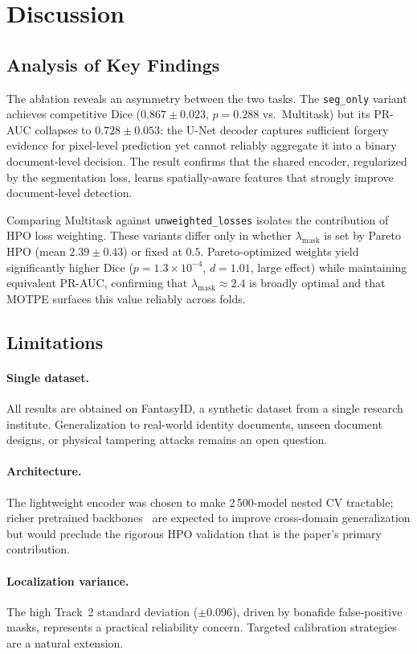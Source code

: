 
\section{Discussion}
\label{sec:discussion}

\subsection{Analysis of Key Findings}

The ablation reveals an asymmetry between the two tasks. The
\texttt{seg\_only} variant achieves competitive Dice ($0.867 \pm 0.023$, $p =
0.288$ vs.\ Multitask) but its PR-AUC collapses to $0.728 \pm 0.053$:
the U-Net decoder captures sufficient forgery evidence for pixel-level
prediction yet cannot reliably aggregate it into a binary document-level
decision. The result confirms that the shared encoder, regularized by the
segmentation loss, learns spatially-aware features that strongly improve
document-level detection.

Comparing Multitask against \texttt{unweighted\_losses} isolates the
contribution of HPO loss weighting. These variants differ only in whether
$\lambda_{\text{mask}}$ is set by Pareto HPO (mean $2.39 \pm 0.43$) or fixed
at $0.5$. Pareto-optimized weights yield significantly higher Dice ($p = 1.3
\times 10^{-4}$, $d = 1.01$, large effect) while maintaining equivalent
PR-AUC, confirming that $\lambda_{\text{mask}} \approx 2.4$ is broadly optimal
and that MOTPE surfaces this value reliably across folds.

\subsection{Limitations}

\paragraph{Single dataset.}
All results are obtained on FantasyID, a synthetic dataset from a single
research institute. Generalization to real-world identity documents, unseen
document designs, or physical tampering attacks remains an open question.

\paragraph{Architecture.}
The lightweight encoder was chosen to make 2\,500-model nested CV tractable;
richer pretrained backbones~\citep{dosovitskiy2021vit} are expected to improve
cross-domain generalization but would preclude the rigorous HPO validation
that is the paper's primary contribution.

\paragraph{Localization variance.}
The high Track~2 standard deviation ($\pm 0.096$), driven by bonafide
false-positive masks, represents a practical reliability concern. Targeted
calibration strategies are a natural extension.
